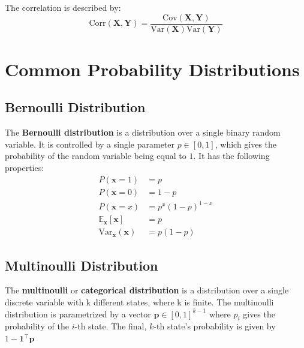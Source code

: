 \documentclass[12pt]{report}
\begin{document}
        The correlation is described by:
        \begin{equation}
            \text{Corr}(\boldsymbol{X}, \boldsymbol{Y}) = \frac{\text{Cov}(\boldsymbol{X}, \boldsymbol{Y})}{\text{Var}(\boldsymbol{X})\text{Var}(\boldsymbol{Y})}
        \end{equation}
        
    \section{Common Probability Distributions}
        \subsection{Bernoulli Distribution}
            The \textbf{Bernoulli distribution} is a distribution over a single binary random variable. It is controlled by a single parameter $p \in [0, 1]$, which gives the probability of the random variable being equal to $1$. It has the following properties:
            \begin{align}
                P(\mathbf{x} = 1) &= p\\
                P(\mathbf{x} = 0) &= 1 - p\\
                P(\mathbf{x} = x) &= p^x (1 - p)^{1-x} \\
                \mathbb{E}_{\mathbf{x}}[\mathbf{x}] &= p \\
                \text{Var}_{\mathbf{x}}(\mathbf{x}) &= p(1 - p)
            \end{align}
            
        \subsection{Multinoulli Distribution}
            The \textbf{multinoulli} or \textbf{categorical distribution} is a distribution over a single discrete variable with k different states, where k is finite. The multinoulli distribution is parametrized by a vector $\boldsymbol{p} \in [0, 1]^{k - 1}$ where $p_i$ gives the probability of the $i$-th state. The final, $k$-th state’s probability is given by $1 − \boldsymbol{1}^\top \boldsymbol{p}$
            
\end{document}
